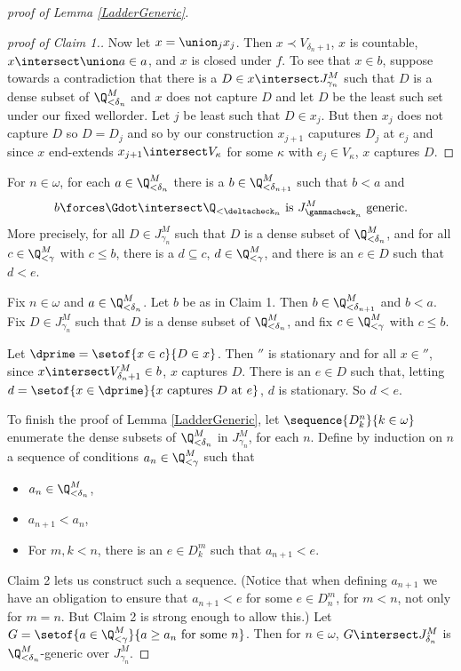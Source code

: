 \documentclass[oneside,12pt]{amsart}
\begin{document}
\begin{proof}[proof of Lemma  \ref{LadderGeneric}]
\begin{proof}[proof of Claim 1.]
Now let $x=\union_j x_j$. Then
$x \prec V_{\delta_n+1}$, $x$ is countable,
$x\intersect\union a \in a$, and $x$ is closed under  $f$. To see that $x\in b$,
 suppose towards a contradiction that there is a $D\in x\intersect J^M_{\gamma_n}$ such that $D$ is a dense subset of $\Q_{<\delta_n}^M$ and $x$ does not capture
$D$ and let $D$ be the least such set under our fixed wellorder. Let $j$ be least such that $D\in x_j$. But then $x_j$ does not capture $D$ so $D=D_j$ and so by our construction $x_{j+1}$ caputures
$D_j$ at $e_j$ and since $x$ end-extends $x_{j+1}\intersect V_{\kappa}$ for some $\kappa$
with $e_j\in V_{\kappa}$, $x$ captures $D$.
\end{proof}

\begin{claim}[Claim 2]
For $n\in\omega$, for each $a\in \Q_{<\delta_n}^M$ there is a $b\in \Q_{<\delta_{n+1}}^M$ such
that $b < a$ and
$$b\forces\Gdot\intersect \Q_{<\deltacheck_n}\text{ is } J^M_{\gammacheck_n}\text{ generic.}$$
More precisely,
for all $D\in J^M_{\gamma_n}$ such that $D$ is a dense
subset of $\Q_{<\delta_n}^M$, and for all $c\in \Q_{<\gamma}^M$ with
$c\leq b$, there is a $d\subseteq c$, $d\in \Q_{<\gamma}^M$, and
there is an $e\in D$ such that $d < e$.
\end{claim}
\begin{subproof}
Fix $n\in\omega$ and $a\in \Q_{<\delta_n}^M$. Let $b$ be as in Claim 1.
Then $b\in \Q_{<\delta_{n+1}}^M$ and
$b<a$. Fix $D\in J^M_{\gamma_n}$ such that $D$ is a dense
subset of $\Q_{<\delta_n}^M$, and fix $c\in \Q_{<\gamma}^M$ with
$c\leq b$.

Let $\dprime=\setof{x\in c}{D\in x}$. Then $\dprime$ is stationary
and for all $x\in\dprime$, since $x\intersect V^M_{\delta_n+1}\in b$,
$x$ captures $D$. There is an $e\in D$ such that, letting
$d=\setof{x\in\dprime}{x \text{ captures } D \text{ at } e}$, $d$ is stationary.
So $d<e$.
\end{subproof}

To finish the proof of Lemma  \ref{LadderGeneric}, let
$\sequence{D^n_k}{k\in\omega}$ enumerate the dense subsets of
$\Q_{<\delta_n}^M$ in $J^M_{\gamma_n}$, for each $n$. Define by induction on
$n$ a sequence of conditions $a_n\in\Q_{<\gamma}^M$ such that
\begin{itemize}
\item $a_n\in\Q^M_{<\delta_n}$,
\item $a_{n+1} < a_n$,
\item For $m,k < n$, there is an $e\in D^m_k$ such that $a_{n+1}<e$.
\end{itemize}
Claim 2 lets us construct such a sequence. (Notice that when defining
$a_{n+1}$ we have an obligation to ensure that $a_{n+1}<e$ for some
$e\in D^m_n$, for $m<n$, not only for $m=n$. But Claim 2 is strong enough
to allow this.)
Let $G=\setof{a\in \Q_{<\gamma}^M}{a\geq a_n \text{ for some } n}$.
Then for $n\in\omega$,
$G\intersect J^M_{\delta_n}$ is $\Q_{<\delta_n}^M$-generic over $J^M_{\gamma_n}$.

\end{proof}
\end{document}
